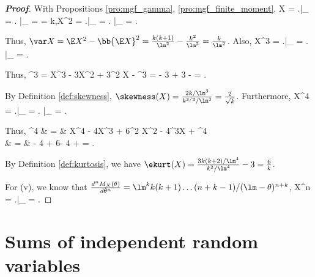 \begin{proof}[\bf Proof]%
With Propositions \ref{pro:mgf_gamma}, \ref{pro:mgf_finite_moment},
\beast
\E X = \left.\right|_{} = \left. \right|_{} =  = \frac k{\lm},\qquad \E X^2 = \left.\right|_{} = \left.  \right|_{} = .
\eeast

Thus, $\var X = \E X^2 - \bb{\E X}^2 = \frac{k(k+1)}{\lm^2} - \frac{k^2}{\lm^2} = \frac{k}{\lm^2}$. Also,
\be
\E X^3 = \left.\right|_{} = \left.   \right|_{} = .
\ee

Thus,
\be
\E{}^3 = \E X^3 - 3\mu\E X^2 + 3\mu^2 \E X - \mu^3 =   - 3  + 3   -  = .
\ee

By Definition \ref{def:skewness}, $\skewness(X) = \frac{2k/\lm^3}{k^{3/2}/\lm^3} = \frac 2{\sqrt{k}}$. Furthermore,
\be
\E X^4 = \left.\right|_{} = \left.   \right|_{}  = .
\ee

Thus,
\beast
\E{}^4 & = & \E X^4 - 4\mu\E X^3 + 6\mu^2 \E X^2 - 4\mu^3\E X + \mu^4 \\
& = &  - 4 + 6- 4 +  =  .
\eeast

By Definition \ref{def:kurtosis}, we have $\ekurt(X) = \frac{3k(k+2)/\lm^4}{k^2/\lm^4} -3 = \frac 6k$.

For (v), we know that $\frac {d^n M_X(\theta)}{d\theta^n} = \lm^k k(k+1)\dots (n+k-1)/(\lm -\theta)^{n+k}$,
\be
\E X^n = \left.\right|_{} = .
\ee
\end{proof}


\section{Sums of independent random variables}

